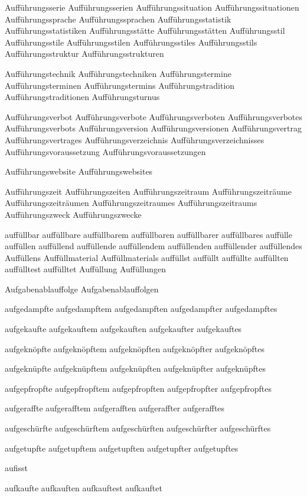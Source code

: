 Aufführungsserie
Aufführungsserien
Aufführungssituation
Aufführungssituationen
Aufführungssprache
Aufführungssprachen
Aufführungsstatistik
Aufführungsstatistiken
Aufführungsstätte
Aufführungsstätten
Aufführungsstil
Aufführungsstile
Aufführungsstilen
Aufführungsstiles
Aufführungsstils
Aufführungsstruktur
Aufführungsstrukturen

Aufführungstechnik
Aufführungstechniken
Aufführungstermine
Aufführungsterminen
Aufführungstermins
Aufführungstradition
Aufführungstraditionen
Aufführungsturnus

Aufführungsverbot
Aufführungsverbote
Aufführungsverboten
Aufführungsverbotes
Aufführungsverbots
Aufführungsversion
Aufführungsversionen
Aufführungsvertrag
Aufführungsvertrages
Aufführungsverzeichnis
Aufführungsverzeichnisses
Aufführungsvoraussetzung
Aufführungsvoraussetzungen

Aufführungswebsite
Aufführungswebsites

Aufführungszeit
Aufführungszeiten
Aufführungszeitraum
Aufführungszeiträume
Aufführungszeiträumen
Aufführungszeitraumes
Aufführungszeitraums
Aufführungszweck
Aufführungszwecke

auffüllbar
auffüllbare
auffüllbarem
auffüllbaren
auffüllbarer
auffüllbares
auffülle
auffüllen
auffüllend
auffüllende
auffüllendem
auffüllenden
auffüllender
auffüllendes
Auffüllens
Auffüllmaterial
Auffüllmaterials
auffüllst
auffüllt
auffüllte
auffüllten
auffülltest
auffülltet
Auffüllung
Auffüllungen

Aufgabenablauffolge
Aufgabenablauffolgen

aufgedampfte
aufgedampftem
aufgedampften
aufgedampfter
aufgedampftes

aufgekaufte
aufgekauftem
aufgekauften
aufgekaufter
aufgekauftes

aufgeknöpfte
aufgeknöpftem
aufgeknöpften
aufgeknöpfter
aufgeknöpftes

aufgeknüpfte
aufgeknüpftem
aufgeknüpften
aufgeknüpfter
aufgeknüpftes

aufgepfropfte
aufgepfropftem
aufgepfropften
aufgepfropfter
aufgepfropftes

aufgeraffte
aufgerafftem
aufgerafften
aufgeraffter
aufgerafftes

aufgeschürfte
aufgeschürftem
aufgeschürften
aufgeschürfter
aufgeschürftes

aufgetupfte
aufgetupftem
aufgetupften
aufgetupfter
aufgetupftes

aufisst

aufkaufte
aufkauften
aufkauftest
aufkauftet

